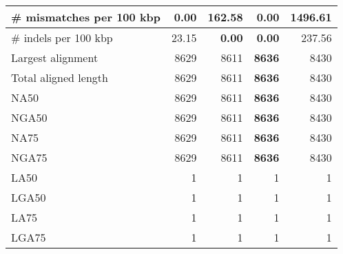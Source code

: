 \documentclass[12pt,a4paper]{article}
\begin{document}
\begin{table}[ht]
\begin{center}
\begin{tabular}{|l*{4}{|r}|}
\# mismatches per 100 kbp & {\bf 0.00} & 162.58 & {\bf 0.00} & 1496.61 \\ \hline
\# indels per 100 kbp & 23.15 & {\bf 0.00} & {\bf 0.00} & 237.56 \\ \hline
Largest alignment & 8629 & 8611 & {\bf 8636} & 8430 \\ \hline
Total aligned length & 8629 & 8611 & {\bf 8636} & 8430 \\ \hline
NA50 & 8629 & 8611 & {\bf 8636} & 8430 \\ \hline
NGA50 & 8629 & 8611 & {\bf 8636} & 8430 \\ \hline
NA75 & 8629 & 8611 & {\bf 8636} & 8430 \\ \hline
NGA75 & 8629 & 8611 & {\bf 8636} & 8430 \\ \hline
LA50 & 1 & 1 & 1 & 1 \\ \hline
LGA50 & 1 & 1 & 1 & 1 \\ \hline
LA75 & 1 & 1 & 1 & 1 \\ \hline
LGA75 & 1 & 1 & 1 & 1 \\ \hline
\end{tabular}
\end{center}
\end{table}
\end{document}
